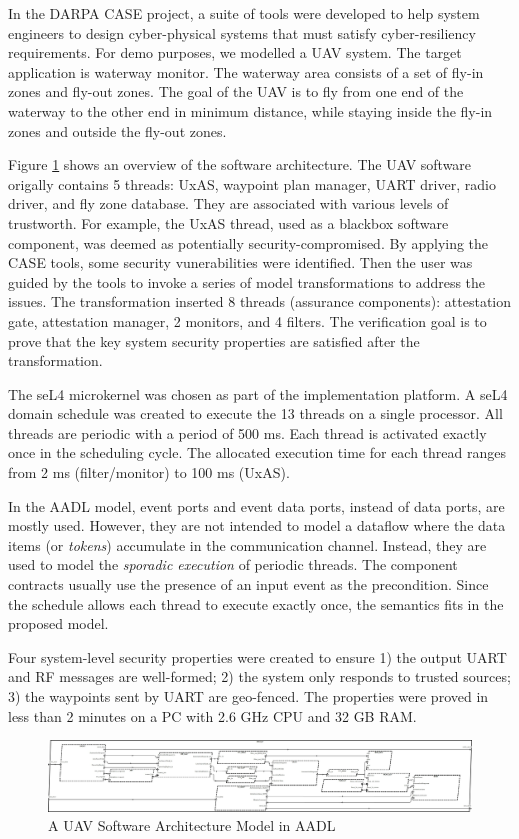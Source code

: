 In the DARPA CASE project, a suite of tools were developed to help system engineers to design cyber-physical systems that must satisfy cyber-resiliency requirements.
For demo purposes, we modelled a UAV system. The target application is waterway monitor. The waterway area consists of a set of fly-in zones and fly-out zones. The goal of the UAV is to fly from one end of the waterway to the other end in minimum distance, while staying inside the fly-in zones and outside the fly-out zones.
 
Figure \ref{SW} shows an overview of the software architecture. The UAV software origally contains 5 threads: UxAS, waypoint plan manager, UART driver, radio driver, and fly zone database. They are associated with various levels of trustworth. For example, the UxAS thread, used as a blackbox software component, was deemed as potentially security-compromised.
By applying the CASE tools, some security vunerabilities were identified. Then the user was guided by the tools to invoke a series of model transformations to address the issues. The transformation inserted 8 threads (assurance components): attestation gate, attestation manager, 2 monitors, and 4 filters. The verification goal is to prove that the key system security properties are satisfied after the transformation.  

The seL4 microkernel was chosen as part of the implementation platform. A seL4 domain schedule was created to execute the 13 threads on a single processor. All threads are periodic with a period of 500 ms. Each thread is activated exactly once in the scheduling cycle. The allocated execution time for each thread ranges from 2 ms (filter/monitor) to 100 ms (UxAS).

In the AADL model, event ports and event data ports, instead of data ports, are mostly used.  However, they are not intended to model a dataflow where the data items (or \emph{tokens}) accumulate in the communication channel. Instead, they are used to model the \emph{sporadic execution} of periodic threads. The component contracts usually use the presence of an input event as the precondition. Since the schedule allows each thread to execute exactly once, the semantics fits in the proposed model.

Four system-level security properties were created to ensure 1) the output UART and RF messages are well-formed; 2) the system only responds to trusted sources; 3) the waypoints sent by UART are geo-fenced. The properties were proved in less than 2 minutes on a PC with 2.6 GHz CPU and 32 GB RAM.

\begin{figure}[ht!]
\centering
\includegraphics[width=130mm]{sw.jpg}
\caption{A UAV Software Architecture Model in AADL \label{SW}}
\end{figure}
